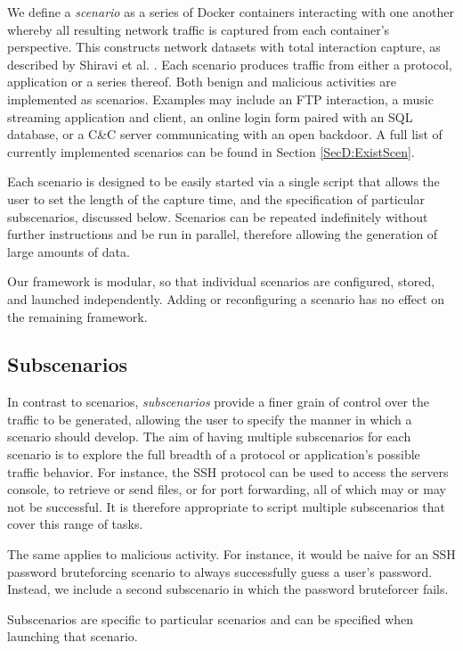 We define a \emph{scenario} as a series of Docker containers interacting with one another whereby all resulting network traffic is captured from each container's perspective. This constructs network datasets with total interaction capture, as described by Shiravi et al. \cite{shiravi2012toward}. Each scenario produces traffic from either a protocol, application or a series thereof. Both benign and malicious activities are implemented as scenarios. Examples may include an FTP interaction, a music streaming application and client, an online login form paired with an SQL database, or a C\&C server communicating with an open backdoor. A full list of currently implemented scenarios can be found in Section \ref{SecD:ExistScen}.

Each scenario is designed to be easily started via a single script that allows the user to set the length of the capture time, and the specification of particular subscenarios, discussed below. Scenarios can be repeated indefinitely without further instructions and be run in parallel, therefore allowing the generation of large amounts of data.

Our framework is modular, so that individual scenarios are configured, stored, and launched independently. Adding or reconfiguring a scenario has no effect on the remaining framework.

\subsection{Subscenarios} \label{SecD:Subscenarios}

In contrast to scenarios, \textit{subscenarios} provide a finer grain of control over the traffic to be generated, allowing the user to specify the manner in which a scenario should develop. The aim of having multiple subscenarios for each scenario is to explore the full breadth of a protocol or application's possible traffic behavior. For instance, the SSH protocol can be used to access the servers console, to retrieve or send files, or for port forwarding, all of which may or may not be successful. It is therefore appropriate to script multiple subscenarios that cover this range of tasks.

The same applies to malicious activity. For instance, it would be naive for an SSH password bruteforcing scenario to always successfully guess a user's password. Instead, we include a second subscenario in which the password bruteforcer fails.

Subscenarios are specific to particular scenarios and can be specified when launching that scenario.

